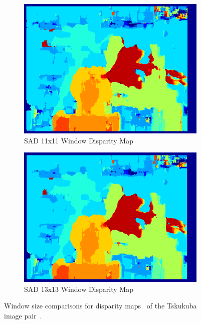 \begin{figure}
\begin{center}
\begin{subfigure}{0.45\textwidth}
		\includegraphics[width=\textwidth]{figures/sad_tsukuba_11x11_0-15.png}
		\caption{SAD 11x11 Window Disparity Map}
		\label{fig:tsukuba11x11}
	\end{subfigure}
	\begin{subfigure}{0.45\textwidth}
		\includegraphics[width=\textwidth]{figures/sad_tsukuba_13x13_0-15.png}
		\caption{SAD 13x13 Window Disparity Map}
		\label{fig:tsukuba13x13}
	\end{subfigure}
	\captionfonts
	\caption{Window size comparisons for disparity maps~\cite{matlab} of the Tskukuba image pair~\cite{middlebury}.}
	\label{fig:tsukubaWinSize}
\end{center}
\end{figure}

